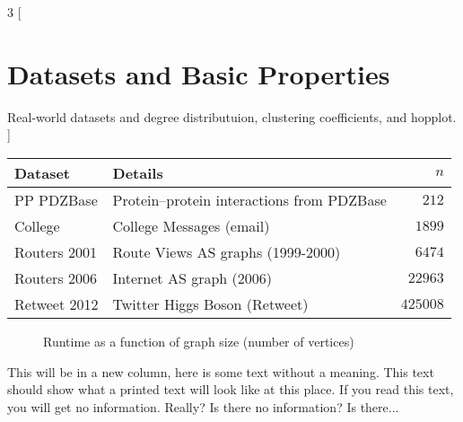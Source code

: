 \documentclass[18pt]{article}
\begin{document}
\begin{multicols}{3}
[
	\section{Datasets and Basic Properties}
	Real-world datasets and degree distributuion, clustering coefficients, and hopplot.	
]
\begin{tabular}{@{} llr @{}}
	\textbf{Dataset} & \textbf{Details} & \textbf{$n$}\\

\toprule
	PP PDZBase	& Protein–protein interactions from PDZBase & $212$\\
	College & College Messages (email) & $1899$\\
	Routers 2001 & Route Views AS graphs (1999-2000)	& $6474$\\
	Routers 2006 & Internet AS graph (2006)						& $22963$\\
	Retweet 2012 & Twitter Higgs Boson (Retweet) & $425008$
\end{tabular}

\begin{figure}[H]
  \centering
	\resizebox{\columnwidth}{!}{
		
		
		
		}
  \caption{Runtime as a function of graph size (number of vertices)}
\end{figure}

%
%
%

\columnbreak
	\noindent\begin{minipage}[t]{\columnwidth}%
				This will be in a new column, here is some text without a meaning.  This text
				should show what a printed text will look like at this place. If you read this text, you will get no information.  Really?  Is there
				 no information?  Is there...
	\end{minipage}

\columnbreak
\blindtext
\end{multicols}
\end{document}
